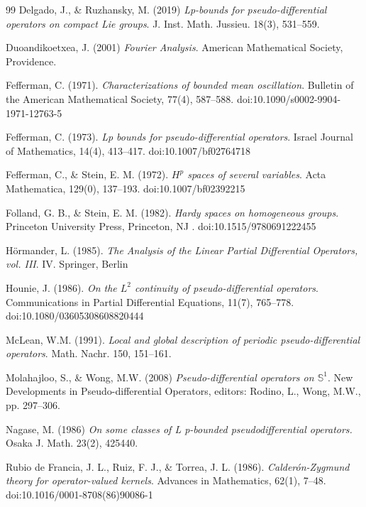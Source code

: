 \documentclass[12pt, reqno]{amsart}
\theoremstyle{definition}
\theoremstyle{remark}
\numberwithin{equation}{section}
\begin{document}
\begin{thebibliography}{99}
Delgado, J., \& Ruzhansky, M. (2019) \textit{Lp-bounds for pseudo-differential operators on compact Lie groups}. J. Inst. Math. Jussieu. 18(3), 531–559.

Duoandikoetxea, J. (2001) \textit{Fourier Analysis}. American Mathematical Society, Providence.



Fefferman, C. (1971). \textit{Characterizations of bounded mean oscillation}. Bulletin of the American Mathematical Society, 77(4), 587–588. doi:10.1090/s0002-9904-1971-12763-5 

Fefferman, C. (1973). \textit{Lp bounds for pseudo-differential operators}. Israel Journal of Mathematics, 14(4), 413–417. doi:10.1007/bf02764718 

Fefferman, C., \& Stein, E. M. (1972). \textit{$H^p$ spaces of several variables}. Acta Mathematica, 129(0), 137–193. doi:10.1007/bf02392215 

Folland, G. B., \& Stein, E. M. (1982). \textit{Hardy spaces on homogeneous groups}. Princeton University Press, Princeton, NJ . doi:10.1515/9780691222455 

Hörmander, L. (1985). \textit{The Analysis of the Linear Partial Differential Operators, vol. III}. IV. Springer, Berlin


Hounie, J. (1986). \textit{On the $L^2$ continuity of pseudo-differential operators}. Communications in Partial Differential Equations, 11(7), 765–778. doi:10.1080/03605308608820444 

McLean, W.M. (1991). \textit{Local and global description of periodic pseudo-differential operators}. Math. Nachr.
150, 151–161.

Molahajloo, S., \& Wong, M.W. (2008) \textit{Pseudo-differential operators on $\mathbb{S}^1$}. New Developments in Pseudo-differential Operators, editors: Rodino, L., Wong, M.W., pp. 297–306. 

Nagase, M. (1986) \textit{On some classes of L p-bounded pseudodifferential operators.} Osaka J. Math. 23(2),
425440.

Rubio de Francia, J. L., Ruiz, F. J., \& Torrea, J. L. (1986). \textit{Calderón-Zygmund theory for operator-valued kernels}. Advances in Mathematics, 62(1), 7–48. doi:10.1016/0001-8708(86)90086-1 


\end{thebibliography}
\end{document}
